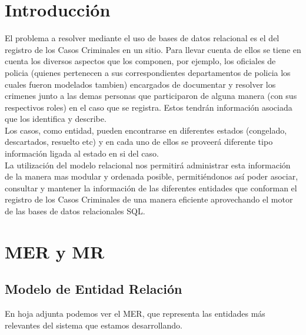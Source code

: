 \documentclass[10pt,a4paper]{article}
\begin{document}

\fecha{\today}


\maketitle

\tableofcontents
\newpage

\section{Introducción}
El problema a resolver mediante el uso de bases de datos relacional es el del registro de los Casos Criminales en un sitio. Para llevar cuenta de ellos se tiene en cuenta los diversos aspectos que los componen, por ejemplo, los oficiales de policia (quienes pertenecen a sus correspondientes departamentos de policia los cuales fueron modelados tambien) encargados de documentar y resolver los crimenes junto a las demas personas que participaron de alguna manera (con sus respectivos roles) en el caso que se registra. Estos tendrán información asociada que los identifica y describe. \\
Los casos, como entidad, pueden encontrarse en diferentes estados (congelado, descartados, resuelto etc) y en cada uno de ellos se proveerá diferente tipo información ligada al estado en si del caso. \\
La utilización del modelo relacional nos permitirá  administrar esta información de la manera mas modular y ordenada posible, permitiéndonos así poder asociar, consultar y mantener la información de las diferentes entidades que conforman el registro de los Casos Criminales de una manera eficiente aprovechando el motor de las bases de datos relacionales SQL.
\section{MER y MR}

\subsection{Modelo de Entidad Relación}
En hoja adjunta podemos ver el MER, que representa las entidades más relevantes del sistema que estamos desarrollando.
\end{document}
